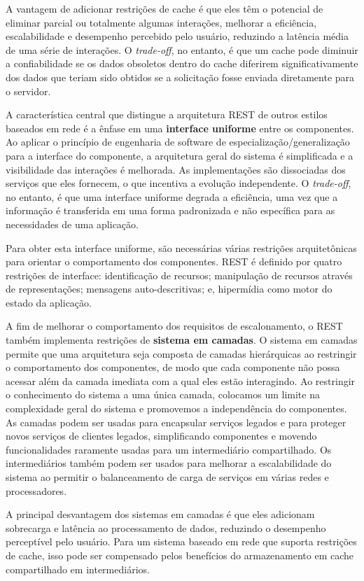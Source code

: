 A vantagem de adicionar restrições de cache é que eles têm o potencial de eliminar parcial ou totalmente algumas interações, melhorar a eficiência, escalabilidade e desempenho percebido pelo usuário, reduzindo a latência média de uma série de interações. O \textit{trade-off}, no entanto, é que um cache pode diminuir a confiabilidade se os dados obsoletos dentro do cache diferirem significativamente dos dados que teriam sido obtidos se a solicitação fosse enviada diretamente para o servidor.

A característica central que distingue a arquitetura REST de outros estilos baseados em rede é a ênfase em uma \textbf{interface uniforme} entre os componentes. Ao aplicar o princípio de engenharia de software de especialização/generalização para a interface do componente, a arquitetura geral do sistema é simplificada e a visibilidade das interações é melhorada. As implementações são dissociadas dos serviços que eles fornecem, o que incentiva a evolução independente. O \textit{trade-off}, no entanto, é que uma interface uniforme degrada a eficiência, uma vez que a informação é transferida em uma forma padronizada e não específica para as necessidades de uma aplicação.

Para obter esta interface uniforme, são necessárias várias restrições arquitetônicas para orientar o comportamento dos componentes. REST é definido por quatro restrições de interface: identificação de recursos; manipulação de recursos através de representações; mensagens auto-descritivas; e, hipermídia como motor do estado da aplicação.

A fim de melhorar o comportamento dos requisitos de escalonamento, o REST também implementa restrições de \textbf{sistema em camadas}. O sistema em camadas permite que uma arquitetura seja composta de camadas hierárquicas ao restringir o comportamento dos componentes, de modo que cada componente não possa acessar além da camada imediata com a qual eles estão interagindo. Ao restringir o conhecimento do sistema a uma única camada, colocamos um limite na complexidade geral do sistema e promovemos a independência do componentes. As camadas podem ser usadas para encapsular serviços legados e para proteger novos serviços de clientes legados, simplificando componentes e movendo funcionalidades raramente usadas para um intermediário compartilhado. Os intermediários também podem ser usados para melhorar a escalabilidade do sistema ao permitir o balanceamento de carga de serviços em várias redes e processadores.

A principal desvantagem dos sistemas em camadas é que eles adicionam sobrecarga e latência ao processamento de dados, reduzindo o desempenho perceptível pelo usuário. Para um sistema baseado em rede que suporta restrições de cache, isso pode ser compensado pelos benefícios do armazenamento em cache compartilhado em intermediários.

